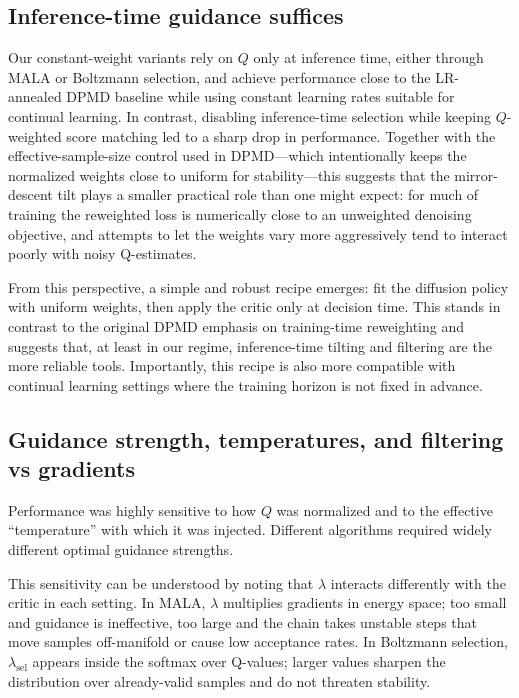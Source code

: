 \documentclass{article}
\theoremstyle{plain}
\theoremstyle{definition}
\theoremstyle{remark}
\begin{document}
\subsection{Inference-time guidance suffices}

Our constant-weight variants rely on $Q$ only at inference time, either through MALA or Boltzmann selection, and achieve performance close to the LR-annealed DPMD baseline while using constant learning rates suitable for continual learning.
In contrast, disabling inference-time selection while keeping $Q$-weighted score matching led to a sharp drop in performance.
Together with the effective-sample-size control used in DPMD---which intentionally keeps the normalized weights close to uniform for stability---this suggests that the mirror-descent tilt plays a smaller practical role than one might expect: for much of training the reweighted loss is numerically close to an unweighted denoising objective, and attempts to let the weights vary more aggressively tend to interact poorly with noisy Q-estimates.

From this perspective, a simple and robust recipe emerges: fit the diffusion policy with uniform weights, then apply the critic only at decision time.
This stands in contrast to the original DPMD emphasis on training-time reweighting and suggests that, at least in our regime, inference-time tilting and filtering are the more reliable tools.
Importantly, this recipe is also more compatible with continual learning settings where the training horizon is not fixed in advance.

\subsection{Guidance strength, temperatures, and filtering vs gradients}

Performance was highly sensitive to how $Q$ was normalized and to the effective ``temperature'' with which it was injected.
Different algorithms required widely different optimal guidance strengths.

This sensitivity can be understood by noting that $\lambda$ interacts differently with the critic in each setting.
In MALA, $\lambda$ multiplies gradients in energy space; too small and guidance is ineffective, too large and the chain takes unstable steps that move samples off-manifold or cause low acceptance rates.
In Boltzmann selection, $\lambda_{\text{sel}}$ appears inside the softmax over Q-values; larger values sharpen the distribution over already-valid samples and do not threaten stability.
\end{document}
